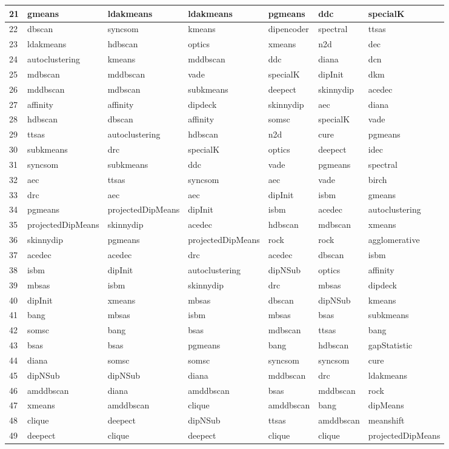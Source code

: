 \begin{table}[H]
\begin{tabular}{|l|l|l|l|l|l|l|}
\hline
21 & gmeans & ldakmeans & ldakmeans & pgmeans & ddc & specialK \\
\hline
22 & dbscan & syncsom & kmeans & dipencoder & spectral & ttsas \\
\hline
23 & ldakmeans & hdbscan & optics & xmeans & n2d & dec \\
\hline
24 & autoclustering & kmeans & mddbscan & ddc & diana & dcn \\
\hline
25 & mdbscan & mddbscan & vade & specialK & dipInit & dkm \\
\hline
26 & mddbscan & mdbscan & subkmeans & deepect & skinnydip & acedec \\
\hline
27 & affinity & affinity & dipdeck & skinnydip & aec & diana \\
\hline
28 & hdbscan & dbscan & affinity & somsc & specialK & vade \\
\hline
29 & ttsas & autoclustering & hdbscan & n2d & cure & pgmeans \\
\hline
30 & subkmeans & drc & specialK & optics & deepect & idec \\
\hline
31 & syncsom & subkmeans & ddc & vade & pgmeans & spectral \\
\hline
32 & aec & ttsas & syncsom & aec & vade & birch \\
\hline
33 & drc & aec & aec & dipInit & isbm & gmeans \\
\hline
34 & pgmeans & projectedDipMeans & dipInit & isbm & acedec & autoclustering \\
\hline
35 & projectedDipMeans & skinnydip & acedec & hdbscan & mdbscan & xmeans \\
\hline
36 & skinnydip & pgmeans & projectedDipMeans & rock & rock & agglomerative \\
\hline
37 & acedec & acedec & drc & acedec & dbscan & isbm \\
\hline
38 & isbm & dipInit & autoclustering & dipNSub & optics & affinity \\
\hline
39 & mbsas & isbm & skinnydip & drc & mbsas & dipdeck \\
\hline
40 & dipInit & xmeans & mbsas & dbscan & dipNSub & kmeans \\
\hline
41 & bang & mbsas & isbm & mbsas & bsas & subkmeans \\
\hline
42 & somsc & bang & bsas & mdbscan & ttsas & bang \\
\hline
43 & bsas & bsas & pgmeans & bang & hdbscan & gapStatistic \\
\hline
44 & diana & somsc & somsc & syncsom & syncsom & cure \\
\hline
45 & dipNSub & dipNSub & diana & mddbscan & drc & ldakmeans \\
\hline
46 & amddbscan & diana & amddbscan & bsas & mddbscan & rock \\
\hline
47 & xmeans & amddbscan & clique & amddbscan & bang & dipMeans \\
\hline
48 & clique & deepect & dipNSub & ttsas & amddbscan & meanshift \\
\hline
49 & deepect & clique & deepect & clique & clique & projectedDipMeans \\
\hline
\end{tabular}
\end{table}